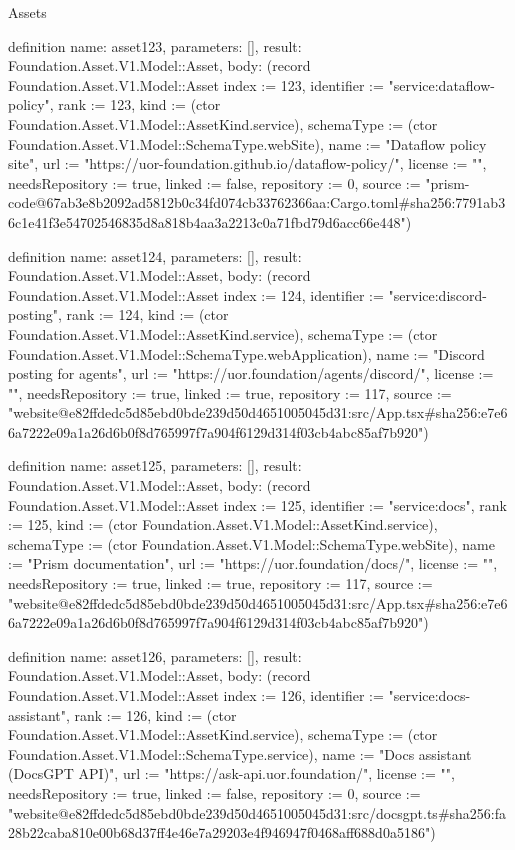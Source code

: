 \begin{lexlean}{Assets}
\begin{semanticmodule}
definition{
  name: asset123,
  parameters: [],
  result: Foundation.Asset.V1.Model::Asset,
  body: (record Foundation.Asset.V1.Model::Asset {index := 123, identifier := "service:dataflow-policy", rank := 123, kind := (ctor Foundation.Asset.V1.Model::AssetKind.service), schemaType := (ctor Foundation.Asset.V1.Model::SchemaType.webSite), name := "Dataflow policy site", url := "https://uor-foundation.github.io/dataflow-policy/", license := "", needsRepository := true, linked := false, repository := 0, source := "prism-code@67ab3e8b2092ad5812b0c34fd074cb33762366aa:Cargo.toml#sha256:7791ab36c1e41f3e54702546835d8a818b4aa3a2213c0a71fbd79d6acc66e448"})
}

definition{
  name: asset124,
  parameters: [],
  result: Foundation.Asset.V1.Model::Asset,
  body: (record Foundation.Asset.V1.Model::Asset {index := 124, identifier := "service:discord-posting", rank := 124, kind := (ctor Foundation.Asset.V1.Model::AssetKind.service), schemaType := (ctor Foundation.Asset.V1.Model::SchemaType.webApplication), name := "Discord posting for agents", url := "https://uor.foundation/agents/discord/", license := "", needsRepository := true, linked := true, repository := 117, source := "website@e82ffdedc5d85ebd0bde239d50d4651005045d31:src/App.tsx#sha256:e7e66a7222e09a1a26d6b0f8d765997f7a904f6129d314f03cb4abc85af7b920"})
}

definition{
  name: asset125,
  parameters: [],
  result: Foundation.Asset.V1.Model::Asset,
  body: (record Foundation.Asset.V1.Model::Asset {index := 125, identifier := "service:docs", rank := 125, kind := (ctor Foundation.Asset.V1.Model::AssetKind.service), schemaType := (ctor Foundation.Asset.V1.Model::SchemaType.webSite), name := "Prism documentation", url := "https://uor.foundation/docs/", license := "", needsRepository := true, linked := true, repository := 117, source := "website@e82ffdedc5d85ebd0bde239d50d4651005045d31:src/App.tsx#sha256:e7e66a7222e09a1a26d6b0f8d765997f7a904f6129d314f03cb4abc85af7b920"})
}

definition{
  name: asset126,
  parameters: [],
  result: Foundation.Asset.V1.Model::Asset,
  body: (record Foundation.Asset.V1.Model::Asset {index := 126, identifier := "service:docs-assistant", rank := 126, kind := (ctor Foundation.Asset.V1.Model::AssetKind.service), schemaType := (ctor Foundation.Asset.V1.Model::SchemaType.service), name := "Docs assistant (DocsGPT API)", url := "https://ask-api.uor.foundation/", license := "", needsRepository := true, linked := false, repository := 0, source := "website@e82ffdedc5d85ebd0bde239d50d4651005045d31:src/docsgpt.ts#sha256:fa28b22caba810e00b68d37ff4e46e7a29203e4f946947f0468aff688d0a5186"})
}


\end{semanticmodule}
\end{lexlean}
